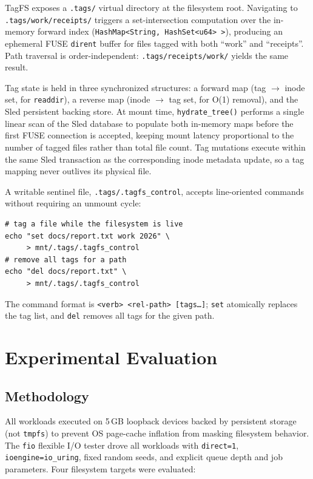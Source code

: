 \documentclass[conference]{IEEEtran}
\begin{document}
TagFS exposes a \texttt{.tags/} virtual directory at the filesystem root.
Navigating to \texttt{.tags/work/receipts/} triggers a set-intersection
computation over the in-memory forward index
(\texttt{HashMap\textless{}String, HashSet\textless{}u64\textgreater{}%
\textgreater{}}), producing an ephemeral FUSE \texttt{dirent} buffer for
files tagged with both ``work'' and ``receipts''. Path traversal is
order-independent: \texttt{.tags/receipts/work/} yields the same result.

Tag state is held in three synchronized structures: a forward map
(tag $\to$ inode set, for \texttt{readdir}), a reverse map (inode $\to$
tag set, for O(1) removal), and the Sled persistent backing store.
At mount time, \texttt{hydrate\_tree()} performs a single linear scan of
the Sled database to populate both in-memory maps before the first FUSE
connection is accepted, keeping mount latency proportional to the number of
tagged files rather than total file count. Tag mutations execute within the
same Sled transaction as the corresponding inode metadata update, so a tag
mapping never outlives its physical file.

A writable sentinel file, \texttt{.tags/.tagfs\_control}, accepts
line-oriented commands without requiring an unmount cycle:
\begin{lstlisting}
# tag a file while the filesystem is live
echo "set docs/report.txt work 2026" \
     > mnt/.tags/.tagfs_control
# remove all tags for a path
echo "del docs/report.txt" \
     > mnt/.tags/.tagfs_control
\end{lstlisting}
The command format is \texttt{\textless{}verb\textgreater{} \textless{}rel-path\textgreater{} [tags\ldots]};
\texttt{set} atomically replaces the tag list, and \texttt{del} removes
all tags for the given path.

\section{Experimental Evaluation}
\label{sec:eval}

\subsection{Methodology}

All workloads executed on 5\,GB loopback devices backed by persistent
storage (not \texttt{tmpfs}) to prevent OS page-cache inflation from
masking filesystem behavior. The \texttt{fio} flexible I/O tester drove
all workloads with \texttt{direct=1}, \texttt{ioengine=io\_uring}, fixed
random seeds, and explicit queue depth and job parameters. Four filesystem
targets were evaluated:
\end{document}
